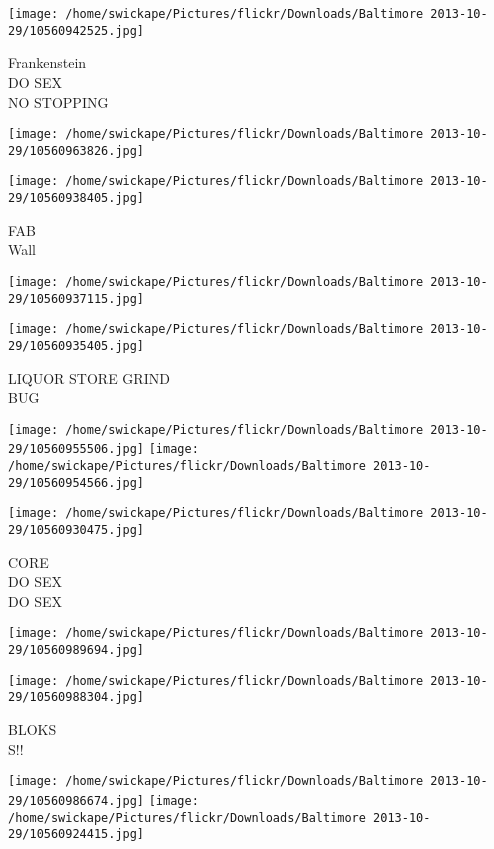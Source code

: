 \documentclass[10pt,letterpaper]{article}
\begin{document}
\texttt{[image: /home/swickape/Pictures/flickr/Downloads/Baltimore 2013-10-29/10560942525.jpg]}

Frankenstein\\
DO SEX\\
NO STOPPING\\
\pagebreak

\texttt{[image: /home/swickape/Pictures/flickr/Downloads/Baltimore 2013-10-29/10560963826.jpg]}

\vspace{0.25in}
\texttt{[image: /home/swickape/Pictures/flickr/Downloads/Baltimore 2013-10-29/10560938405.jpg]}

FAB\\
Wall\\
\pagebreak

\texttt{[image: /home/swickape/Pictures/flickr/Downloads/Baltimore 2013-10-29/10560937115.jpg]}

\vspace{0.25in}
\texttt{[image: /home/swickape/Pictures/flickr/Downloads/Baltimore 2013-10-29/10560935405.jpg]}

LIQUOR STORE GRIND\\
BUG\\
\pagebreak

\texttt{[image: /home/swickape/Pictures/flickr/Downloads/Baltimore 2013-10-29/10560955506.jpg]}
\texttt{[image: /home/swickape/Pictures/flickr/Downloads/Baltimore 2013-10-29/10560954566.jpg]}

\texttt{[image: /home/swickape/Pictures/flickr/Downloads/Baltimore 2013-10-29/10560930475.jpg]}

CORE\\
DO SEX\\
DO SEX\\
\pagebreak

\texttt{[image: /home/swickape/Pictures/flickr/Downloads/Baltimore 2013-10-29/10560989694.jpg]}

\vspace{0.25in}
\texttt{[image: /home/swickape/Pictures/flickr/Downloads/Baltimore 2013-10-29/10560988304.jpg]}

BLOKS\\
S!!\\
\pagebreak

\texttt{[image: /home/swickape/Pictures/flickr/Downloads/Baltimore 2013-10-29/10560986674.jpg]}
\texttt{[image: /home/swickape/Pictures/flickr/Downloads/Baltimore 2013-10-29/10560924415.jpg]}
\end{document}
